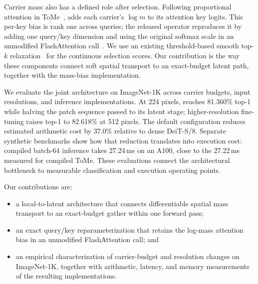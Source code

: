 Carrier mass also has a defined role after selection. Following proportional
attention in ToMe~\citep{tome2023}, \mn{} adds each carrier's $\log m$ to its
attention key logits. This per-key bias is rank one across queries; the
released operator reproduces it by adding one query/key dimension and using
the original softmax scale in an unmodified FlashAttention
call~\citep{flashattn2022}. We use an existing
threshold-based smooth top-$k$ relaxation~\citep{sujianlin2024topk} for the
continuous selection scores. Our contribution is the way these components
connect soft spatial transport to an exact-budget latent path, together with
the mass-bias implementation.

We evaluate the joint architecture on ImageNet-1K across carrier budgets,
input resolutions, and inference implementations. At 224 pixels, \mn{}
reaches 81.360\% top-1 while halving the patch sequence passed to its
latent stage; higher-resolution fine-tuning raises top-1 to 82.618\%
at 512 pixels. The default configuration reduces estimated arithmetic
cost by 37.0\% relative to dense DeiT-S/8. Separate synthetic benchmarks
show how that reduction translates into execution cost: compiled
batch-64 inference takes 27.24\,ms on an A100, close to the 27.22\,ms
measured for compiled ToMe. These evaluations connect the architectural
bottleneck to measurable classification and execution operating points.

Our contributions are:
\begin{itemize}
  \item a local-to-latent architecture that connects differentiable spatial
  mass transport to an exact-budget gather within one forward pass;
  \item an exact query/key reparameterization that retains the log-mass
  attention bias in an unmodified FlashAttention call; and
  \item an empirical characterization of carrier-budget and resolution
  changes on ImageNet-1K, together with arithmetic, latency, and memory
  measurements of the resulting implementations.
\end{itemize}
